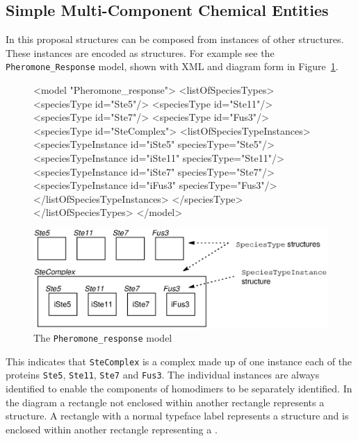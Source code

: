 \documentclass{cekarticle}
\begin{document}
\subsection{Simple Multi-Component Chemical Entities}
\label{sec:multicomponentspecies}

In this proposal  structures can be composed
from instances of other  structures. These
instances are encoded as  structures.
For example see the \texttt{Pheromone\_Response} model, shown with
XML and diagram form in Figure~\ref{fig:pheromone_response}.

\begin{figure}[h]
\begin{example}
<model "Pheromone_response">
    <listOfSpeciesTypes>
        <speciesType id="Ste5"/>
        <speciesType id="Ste11"/>
        <speciesType id="Ste7"/>
        <speciesType id="Fus3"/>
        <speciesType id="SteComplex">
            <listOfSpeciesTypeInstances>
                <speciesTypeInstance id="iSte5" speciesType="Ste5"/>
                <speciesTypeInstance id="iSte11" speciesType="Ste11"/>
                <speciesTypeInstance id="iSte7" speciesType="Ste7"/>
                <speciesTypeInstance id="iFus3" speciesType="Fus3"/>
            </listOfSpeciesTypeInstances>
        </speciesType>
    </listOfSpeciesTypes>
</model>
\end{example}
  \vspace*{8pt}
  \centering
  \includegraphics[scale = 0.7]{pheromone_response.eps}
  \caption{The \texttt{Pheromone\_response} model}
  \label{fig:pheromone_response}
\end{figure}

This indicates that \texttt{SteComplex} is a complex made up of
one instance each of the proteins \texttt{Ste5}, \texttt{Ste11},
\texttt{Ste7} and \texttt{Fus3}.  The individual instances are
always identified to enable the components of homodimers to be
separately identified.  In the diagram a rectangle not enclosed
within another rectangle represents a 
structure. A rectangle with a normal typeface label represents a
 structure and is enclosed within
another rectangle representing a .
\end{document}
